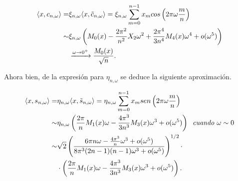 \noindent
\begin{align*}
\langle x,
c_{n, \omega}
\rangle = & 
\xi_{n, \omega} \langle x,
\tilde{c}_{n, \omega}
\rangle =  
\xi_{n, \omega} \sum\limits_{m=0}^{n-1}x_{m} cos \left(
2 \pi \omega \frac{m}{n}
\right)
\\
\sim &
\xi_{n, \omega} 
\left(
M_{0}(x) - \frac{2 \pi^{2}}{n^{2}}X_{2} \omega^{2} 
+ \frac{2 \pi^{4}}{3n^{4}} M_{4}(x) \omega^{4} + o(\omega^{5})
\right) \\ &
\xrightarrow{\omega \rightarrow 0^{+}} \frac{M_{0}(x)}{\sqrt{n}}
. \\
\end{align*}

\noindent
Ahora bien, de la expresión para
$\eta_{n, \omega}$ se deduce la siguiente aproximación.

\begin{align*}
\langle x,
s_{n, \omega}
\rangle =
& 
\eta_{n, \omega} \langle x,
\tilde{s}_{n, \omega}
\rangle =  
\eta_{n, \omega} \sum\limits_{m=0}^{n-1}x_{m} sen \left(
2 \pi \omega \frac{m}{n}
\right) \\
\sim &
\eta_{n, \omega}
\left(
\frac{2 \pi}{n} M_{1}(x) \omega - \frac{4 \pi^{3}}{3n^{3}}M_{3}(x) \omega^{3} 
 + o(\omega^{5})
\right)
\hspace{0.2cm}
\textit{cuando } \omega \sim 0
\\
\sim & 
\sqrt{2} 
\left(
\frac{
6 \pi n \omega -
\frac{4 \pi^{3}}{n} \omega^{3} + o(\omega^{5})
}{8 \pi^{3} (2n-1)(n-1)\omega^{3} + o(\omega^{5})
}
\right)^{1/2}
\cdot \\
& \cdot 
\left(
\frac{2 \pi}{n} M_{1}(x) \omega - \frac{4 \pi^{3}}{3n^{3}}M_{3}(x) \omega^{3} 
 + o(\omega^{5})
\right).
\end{align*}

